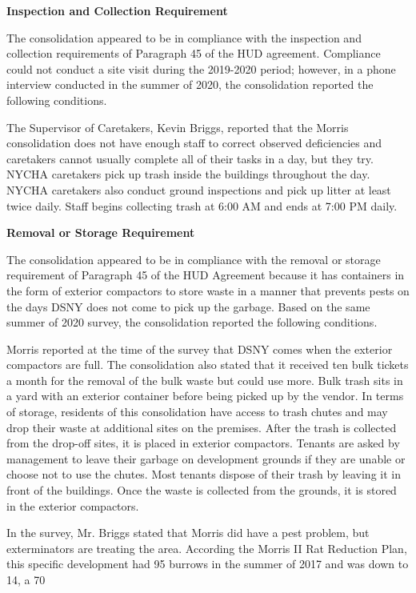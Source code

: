 

\textbf{Inspection and Collection Requirement}

The consolidation appeared to be in compliance with the inspection and collection requirements of Paragraph 45 of the HUD agreement. Compliance could not conduct a site visit during the 2019-2020 period; however, in a phone interview conducted in the summer of 2020, the consolidation reported the following conditions.

The Supervisor of Caretakers, Kevin Briggs, reported that the Morris consolidation does not have enough staff to correct observed deficiencies and caretakers cannot usually complete all of their tasks in a day, but they try. NYCHA caretakers pick up trash inside the buildings throughout the day. NYCHA caretakers also conduct ground inspections and pick up litter at least twice daily. Staff begins collecting trash at 6:00 AM and ends at 7:00 PM daily. 

\textbf{Removal or Storage Requirement}

The consolidation appeared to be in compliance with the removal or storage requirement of Paragraph  45 of the HUD Agreement because it has containers in the form of exterior compactors to store waste in a manner that prevents pests on the days DSNY does not come to pick up the garbage. Based on the same summer of  2020 survey, the consolidation reported the following conditions.

Morris reported at the time of the survey that DSNY comes when the exterior compactors are full. The consolidation also stated that it received ten bulk tickets a month for the removal of the bulk waste but could use more. Bulk trash sits in a yard with an exterior container before being picked up by the vendor. In terms of storage, residents of this consolidation have access to trash chutes and may drop their waste at additional sites on the premises. After the trash is collected from the drop-off sites, it is placed in exterior compactors. Tenants are asked by management to leave their garbage on development grounds if they are unable or choose not to use the chutes. Most tenants dispose of their trash by leaving it in front of the buildings. Once the waste is collected from the grounds, it is stored in the exterior compactors.  

In the survey, Mr. Briggs stated that Morris did have a pest problem, but exterminators are treating the area. According the Morris II Rat Reduction Plan, this specific development had 95 burrows in the summer of 2017 and was down to 14, a 70%

